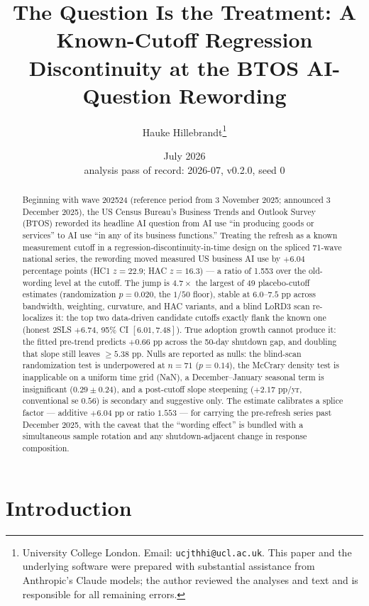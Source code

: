 \documentclass[11pt]{article}
\title{The Question Is the Treatment: A Known-Cutoff Regression Discontinuity
at the BTOS AI-Question Rewording}
\author{Hauke Hillebrandt\thanks{University College London. Email:
\texttt{ucjthhi@ucl.ac.uk}. This paper and the underlying \natex{} software were
prepared with substantial assistance from Anthropic's Claude models; the author
reviewed the analyses and text and is responsible for all remaining errors.}}
\date{July 2026 \\ \small analysis pass of record: 2026-07, \natex{} v0.2.0, seed 0}
\begin{document}
\maketitle

\begin{abstract}
\noindent Beginning with wave 202524 (reference period from 3 November 2025;
announced 3 December 2025), the US Census Bureau's Business Trends and Outlook
Survey (BTOS) reworded its headline AI question from AI use ``in producing
goods or services'' to AI use ``in any of its business functions.'' Treating
the refresh as a known measurement cutoff in a regression-discontinuity-in-time
design on the spliced 71-wave national series, the rewording moved measured US
business AI use by $+6.04$ percentage points (HC1 $z=22.9$; HAC $z=16.3$) ---
a ratio of 1.553 over the old-wording level at the cutoff. The jump is $4.7\times$
the largest of 49 placebo-cutoff estimates (randomization $p=0.020$, the $1/50$
floor), stable at $6.0$--$7.5$ pp across bandwidth, weighting, curvature, and
HAC variants, and a blind LoRD3 scan re-localizes it: the top two data-driven
candidate cutoffs exactly flank the known one (honest 2SLS $+6.74$, 95\% CI
$[6.01, 7.48]$). True adoption growth cannot produce it: the fitted pre-trend
predicts $+0.66$ pp across the 50-day shutdown gap, and doubling that slope
still leaves $\geq 5.38$ pp. Nulls are reported as nulls: the blind-scan
randomization test is underpowered at $n=71$ ($p=0.14$), the McCrary density
test is inapplicable on a uniform time grid (NaN), a December--January
seasonal term is insignificant ($0.29 \pm 0.24$), and a post-cutoff slope
steepening ($+2.17$ pp/yr, conventional se $0.56$) is secondary and suggestive
only. The estimate calibrates a splice factor --- additive $+6.04$ pp or ratio
$1.553$ --- for carrying the pre-refresh series past December 2025, with the
caveat that the ``wording effect'' is bundled with a simultaneous sample
rotation and any shutdown-adjacent change in response composition.
\end{abstract}

\section{Introduction}\label{sec:intro}
\end{document}
